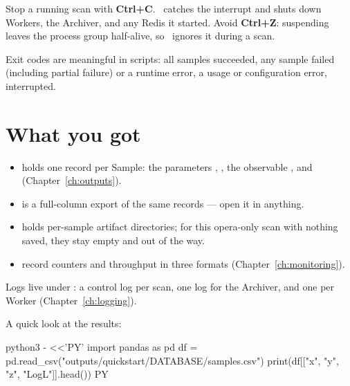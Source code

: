 \begin{jtip}
Stop a running scan with \textbf{Ctrl+C}. \Jtwo\ catches the interrupt and shuts down
Workers, the Archiver, and any Redis it started. Avoid \textbf{Ctrl+Z}: suspending leaves
the process group half-alive, so \Jtwo\ ignores it during a scan.
\end{jtip}

Exit codes are meaningful in scripts:  all samples succeeded,  any sample
failed (including partial failure) or a runtime error,  a usage or configuration
error,  interrupted.

\section{What you got}
\label{sec:quickstart-outputs}

\begin{jfiletree}
\end{jfiletree}

\begin{itemize}
  \item {} holds one record per Sample: the parameters
        , , the observable , and 
        (Chapter~\ref{ch:outputs}).
  \item {} is a full-column export of the same records --- open
        it in anything.
  \item {} holds per-sample artifact directories; for this opera-only scan
        with nothing saved, they stay empty and out of the way.
  \item {} record counters and throughput in three formats
        (Chapter~\ref{ch:monitoring}).
\end{itemize}

Logs live under : a control log per scan, one log for the Archiver, and one
per Worker (Chapter~\ref{ch:logging}).

A quick look at the results:

\begin{terminal}
\begin{jcmd}
python3 - <<'PY'
import pandas as pd
df = pd.read_csv("outputs/quickstart/DATABASE/samples.csv")
print(df[["x", "y", "z", "LogL"]].head())
PY
\end{jcmd}
\end{terminal}

